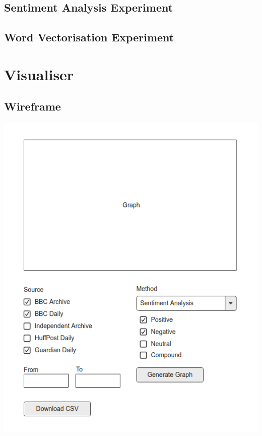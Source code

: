 \documentclass[12pt,a4paper]{article}
\begin{document}
\begin{appendices}
\begin{subappendices}
\subsection{Sentiment Analysis Experiment} \label{app:sentiment-analysis}


\subsection{Word Vectorisation Experiment} \label{app:vectorisation}

\end{subappendices}

\section{Visualiser}
\begin{subappendices}
\subsection{Wireframe} \label{app:vis-wireframe}
\includegraphics[width=\linewidth]{../visualisation/wireframe.png}


\end{subappendices}
\end{appendices}
\end{document}
